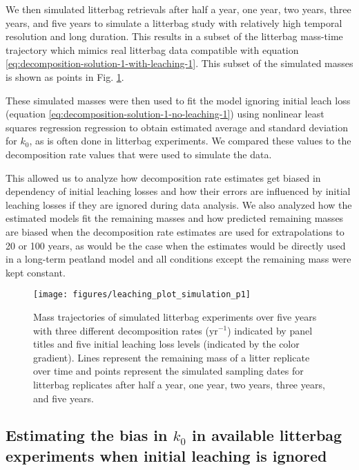 \documentclass[
  12pt,
]{article}
\begin{document}
We then simulated litterbag retrievals after half a year, one year, two years, three years, and five years to simulate a litterbag study with relatively high temporal resolution and long duration. This results in a subset of the litterbag mass-time trajectory which mimics real litterbag data compatible with equation \eqref{eq:decomposition-solution-1-with-leaching-1}. This subset of the simulated masses is shown as points in Fig. \ref{fig:out-simulation-p1}.

These simulated masses were then used to fit the model ignoring initial leach loss (equation \eqref{eq:decomposition-solution-1-no-leaching-1}) using nonlinear least squares regression regression to obtain estimated average and standard deviation for \(k_0\), as is often done in litterbag experiments. We compared these values to the decomposition rate values that were used to simulate the data.

This allowed us to analyze how decomposition rate estimates get biased in dependency of initial leaching losses and how their errors are influenced by initial leaching losses if they are ignored during data analysis. We also analyzed how the estimated models fit the remaining masses and how predicted remaining masses are biased when the decomposition rate estimates are used for extrapolations to 20 or 100 years, as would be the case when the estimates would be directly used in a long-term peatland model and all conditions except the remaining mass were kept constant.



\begin{figure}[H]

{\centering \texttt{[image: figures/leaching\_plot\_simulation\_p1]} 

}

\caption{Mass trajectories of simulated litterbag experiments over five years with three different decomposition rates (yr\(^{-1}\)) indicated by panel titles and five initial leaching loss levels (indicated by the color gradient). Lines represent the remaining mass of a litter replicate over time and points represent the simulated sampling dates for litterbag replicates after half a year, one year, two years, three years, and five years.}\label{fig:out-simulation-p1}
\end{figure}

\hypertarget{methods-bias-real-1}{%
\subsection{\texorpdfstring{Estimating the bias in \(k_0\) in available litterbag experiments when initial leaching is ignored}{Estimating the bias in k\_0 in available litterbag experiments when initial leaching is ignored}}\label{methods-bias-real-1}}
\end{document}
